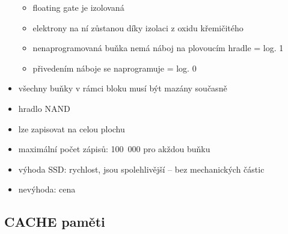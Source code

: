 \documentclass[a4paper,12pt]{article}
\providecommand{\tightlist}{%
\setlength{\itemsep}{0pt}\setlength{\parskip}{0pt}}
\begin{document}
\begin{itemize}
\begin{minipage}[b]{0.5\textwidth}
    \begin{itemize}
      \tightlist
      \item floating gate je izolovaná
      \item elektrony na ní zůstanou díky izolaci z oxidu křemičitého
      \item nenaprogramovaná buňka nemá náboj na plovoucím hradle = log. 1
      \item přivedením náboje se naprogramuje = log. 0
    \end{itemize}
  \end{minipage}
  \item všechny buňky v rámci bloku musí být mazány současně
  \item hradlo NAND
  \item lze zapisovat na celou plochu
  \item maximální počet zápisů: 100~000 pro akždou buňku
  \item výhoda SSD: rychlost, jsou spolehlivější -- bez mechanických částic
  \item nevýhoda: cena
\end{itemize}

\subsection{CACHE paměti}
\end{document}
